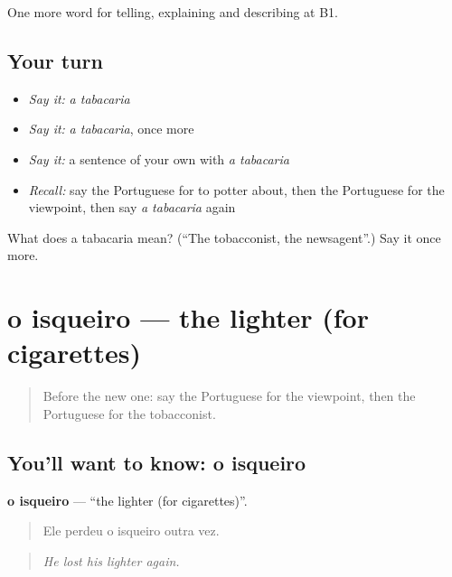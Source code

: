 \begin{grammarlens}[title={What you've built}]
One more word for telling, explaining and describing at B1.
\end{grammarlens}

\subsection*{Your turn}
\begin{itemize}
\raggedright
  \item \emph{Say it:} \emph{a tabacaria}
  \item \emph{Say it:} \emph{a tabacaria}, once more
  \item \emph{Say it:} a sentence of your own with \emph{a tabacaria}
  \item \emph{Recall:} say the Portuguese for to potter about, then the Portuguese for the viewpoint, then say \emph{a tabacaria} again
\end{itemize}

\begin{tcolorbox}[breakable,colback=teal!4,colframe=teal!35!black,title={Before you move on}]
What does a tabacaria mean? (\textquotedblleft{}The tobacconist, the newsagent\textquotedblright{}.) Say it once more.
\end{tcolorbox}
\section[o isqueiro]{o isqueiro — the lighter (for cigarettes)}

\label{lesson:PT-C448-isqueiro}



\begin{quote}
Before the new one: say the Portuguese for the viewpoint, then the Portuguese for the tobacconist.
\end{quote}

\subsection*{You'll want to know: o isqueiro}
\textbf{o isqueiro} — \textquotedblleft{}the lighter (for cigarettes)\textquotedblright{}.

\begin{quote}
Ele perdeu o isqueiro outra vez.
\end{quote}

\begin{quote}
\emph{He lost his lighter again.}
\end{quote}

